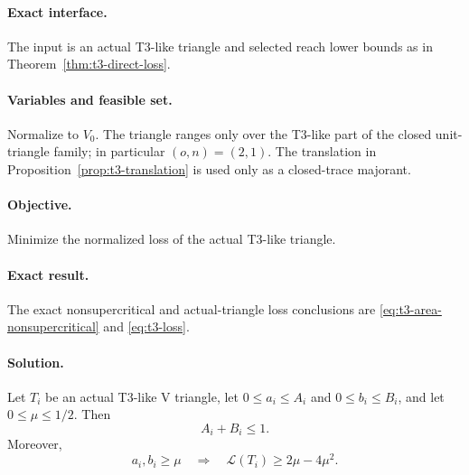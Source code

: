 \paragraph{Exact interface.}
The input is an actual T3-like triangle and selected reach lower bounds as in
Theorem~\ref{thm:t3-direct-loss}.

\paragraph{Variables and feasible set.}
Normalize to $V_0$.  The triangle ranges only over the T3-like part of the
closed unit-triangle family; in particular $(o,n)=(2,1)$.  The translation in
Proposition~\ref{prop:t3-translation} is used only as a closed-trace majorant.

\paragraph{Objective.}
Minimize the normalized loss of the actual T3-like triangle.

\paragraph{Exact result.}
The exact nonsupercritical and actual-triangle loss conclusions are
\eqref{eq:t3-area-nonsupercritical} and \eqref{eq:t3-loss}.

\paragraph{Solution.}

\begin{lemma}
\label{lem:app-t3-direct-loss-calculation}
Let $T_i$ be an actual T3-like V triangle, let
$0\le a_i\le A_i$ and $0\le b_i\le B_i$, and let
$0\le\mu\le1/2$.  Then
\begin{equation}
 A_i+B_i\le1.                         \label{eq:app-t3-area-nonsupercritical}
\end{equation}
Moreover,
\begin{equation}
 a_i,b_i\ge\mu
 \quad\Longrightarrow\quad
 \mathcal L(T_i)\ge2\mu-4\mu^2.                 \label{eq:app-t3-loss}
\end{equation}
\end{lemma}

